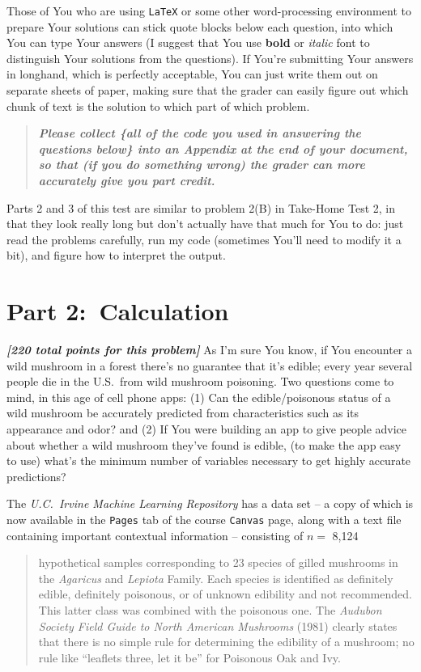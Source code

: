 \documentclass[12pt]{article}
\newcommand{\bi}[1]{\textbf{\textit{#1}}}
\begin{document}
Those of You who are using \texttt{LaTeX} or some other word-processing environment to prepare Your solutions can stick quote blocks below each question, into which You can type Your answers (I suggest that You use \textbf{bold} or \textit{italic} font to distinguish Your solutions from the questions). If You're submitting Your answers in longhand, which is perfectly acceptable, You can just write them out on separate sheets of paper, making sure that the grader can easily figure out which chunk of text is the solution to which part of which problem.
\begin{quote}

\bi{Please collect \{all of the code you used in answering the questions  below\} into an Appendix at the end of your document, so that (if you do something wrong) the grader can more accurately give you part credit.} 

\end{quote}

Parts 2 and 3 of this test are similar to problem 2(B) in Take-Home Test 2, in that they look really long but don't actually have that much for You to do: just read the problems carefully, run my code (sometimes You'll need to modify it a bit), and figure how to interpret the output.

\section*{Part 2:~Calculation}

\bi{[220 total points for this problem]} As I'm sure You know, if You encounter a wild mushroom in a forest there's no guarantee that it's edible; every year several people die in the U.S.~from wild mushroom poisoning. Two questions come to mind, in this age of cell phone apps: (1) Can the edible/poisonous status of a wild mushroom be accurately predicted from characteristics such as its appearance and odor? and (2) If You were building an app to give people advice about whether a wild mushroom they've found is edible, (to make the app easy to use) what's the minimum number of variables necessary to get highly accurate predictions?

The \textit{U.C.~Irvine Machine Learning Repository} has a data set -- a copy of which is now available in the \texttt{Pages} tab of the course \texttt{Canvas} page, along with a text file containing important contextual information -- consisting of $n =$ 8,124 

\begin{quote}

hypothetical samples corresponding to 23 species of gilled mushrooms in the \textit{Agaricus} and \textit{Lepiota} Family. Each species is identified as
definitely edible, definitely poisonous, or of unknown edibility and not recommended. This latter class was combined with the poisonous one. The \textit{Audubon Society Field Guide to North American Mushrooms} (1981) clearly states that there is no simple rule for determining the edibility of a mushroom; no rule like ``leaflets three, let it be'' for Poisonous Oak and Ivy.

\end{quote}
\end{document}
